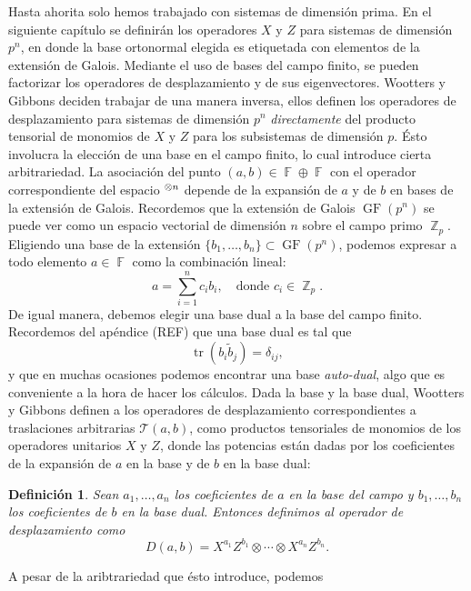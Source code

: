 \documentclass[a4paper]{report}
\DeclareMathOperator{\Z}{\mathbb{Z}}
\DeclareMathOperator{\F}{\mathbb{F}}
\let\H\relax
\DeclareMathOperator{\H}{\mathcal H}
\DeclareMathOperator{\tr}{tr}
\DeclareMathOperator{\GF}{GF}
\newtheorem{definition}{Definición}
\begin{document}
  Hasta ahorita solo hemos trabajado con sistemas de
  dimensión prima. En el siguiente capítulo se definirán los
  operadores $X$ y $Z$ para sistemas de dimensión $p^{n}$,
  en donde la base ortonormal elegida es etiquetada con
  elementos de la extensión de Galois. Mediante el uso de
  bases del campo finito, se pueden factorizar los
  operadores de desplazamiento y de sus eigenvectores.
  Wootters y Gibbons deciden trabajar de una manera inversa,
  ellos definen los operadores de desplazamiento para
  sistemas de dimensión $p^{n}$ \textit{directamente} del
  producto tensorial de monomios de $X$ y $Z$ para los
  subsistemas de dimensión $p$. Ésto involucra la elección
  de una base en el campo finito, lo cual introduce cierta
  arbitrariedad. La asociación del punto $(a,b) \in \F
  \oplus \F$ con el operador correspondiente del espacio
  $\H^{\otimes n}$ depende de la expansión de $a$ y de $b$
  en bases de la extensión de Galois.  Recordemos que la
  extensión de Galois $\GF\left(p^{n}\right)$ se puede ver
  como un espacio vectorial de dimensión $n$ sobre el campo
  primo $\Z_p$.  Eligiendo una base de la extensión
  $\{b_1,\ldots,b_n\} \subset \GF\left(p^{n}\right)$,
  podemos expresar a todo elemento $a \in \F$ como la
  combinación lineal:
  \[
    a = \sum_{i=1}^{n} c_i b_i,
    \quad
    \text{donde } c_i \in \Z_p.
  \] 
  De igual manera, debemos elegir una base dual a la base
  del campo finito. Recordemos del apéndice (REF) que una
  base dual es tal que
  \[
    \tr(b_i \tilde b_j) = \delta_{ij},
  \] 
  y que en muchas ocasiones podemos encontrar una base
  \textit{auto-dual}, algo que es conveniente a la hora de
  hacer los cálculos. Dada la base y la base dual, Wootters
  y Gibbons definen a los operadores de desplazamiento
  correspondientes a traslaciones arbitrarias $\mathcal
  T(a,b)$, como productos tensoriales de monomios de los
  operadores unitarios $X$ y $Z$, donde las potencias están
  dadas por los coeficientes de la expansión de $a$ en la
  base y de $b$ en la base dual:
  \begin{definition}
    Sean $a_1,\ldots,a_n$ los coeficientes de $a$ en la base
    del campo y $b_1,\ldots,b_n$ los coeficientes de $b$ en
    la base dual. Entonces definimos al operador de
    desplazamiento como
    \begin{equation}
      D(a,b)
      = X^{a_1} Z^{b_1} \otimes \cdots \otimes X^{a_n}
      Z^{b_n}.
    \end{equation}
  \end{definition}
  A pesar de la aribtrariedad que ésto introduce, podemos
\end{document}
